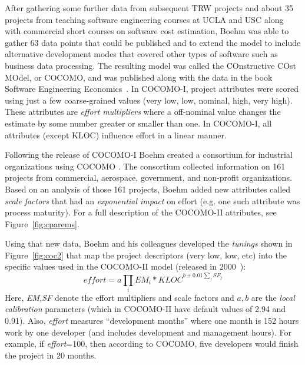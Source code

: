 \documentclass{sig-alternate}
\newcommand{\fig}[1]{Figure~\ref{fig:#1}}
\begin{document}
After  gathering some further data from subsequent
TRW projects and about 35 projects from teaching
software engineering courses at UCLA and USC along
with commercial short courses on software cost
estimation, Boehm was able to gather 63 data points
that could be published and to extend the model to
include alternative development modes that covered
other types of software such as business data
processing.  The resulting model was called the
COnstructive COst MOdel, or COCOMO, and was
published along with the data in the book Software
Engineering Economics~\cite{boehm81}. 
In COCOMO-I, project attributes
were scored using just a few coarse-grained values (very low,
low, nominal, high, very high). These attributes
are {\em effort multipliers} where
a off-nominal value changes the estimate by some number
greater or smaller than one.
In COCOMO-I, all attributes (except KLOC)
influence effort in a linear manner.

Following the release of COCOMO-I Boehm created a consortium for
industrial organizations using COCOMO .
The consortium
collected information on 161 projects from commercial,
aerospace, government, and non-profit organizations.
Based on an analysis of those 161 projects, Boehm
 added  new attributes called {\em scale factors}
that had an {\em exponential impact}
on effort (e.g. one such attribute was process maturity).
 For a full description of the COCOMO-II attributes,
see \fig{cparems}.

Using that new data, Boehm and his colleagues developed
the  {\em tunings} shown in \fig{coc2} that
map the project descriptors (very low, low, etc)
into the specific values used in the COCOMO-II model
(released in 2000~\cite{boehm00b}):
\begin{equation}\label{eq:cocII}
\mathit{effort}=a\prod_i EM_i *\mathit{KLOC}^{b+0.01\sum_j SF_j}
\end{equation}
Here, {\em EM,SF} denote the effort multipliers and scale
factors and
 $a,b$ are the {\em local calibration} parameters (which in COCOMO-II
have default values of 2.94 and 0.91).
Also, {\em effort}
measures ``development months'' where one month
is 152 hours work by one developer (and includes development and management hours).
For example, if {\em effort}=100, then according to COCOMO,
five developers would finish
the project in 20 months.
\end{document}
